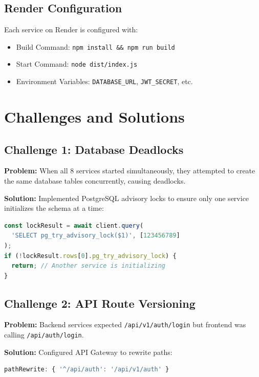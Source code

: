 \documentclass[12pt,a4paper]{article}
\begin{document}
\subsection{Render Configuration}

Each service on Render is configured with:
\begin{itemize}
    \item Build Command: \texttt{npm install \&\& npm run build}
    \item Start Command: \texttt{node dist/index.js}
    \item Environment Variables: \texttt{DATABASE\_URL}, \texttt{JWT\_SECRET}, etc.
\end{itemize}

\section{Challenges and Solutions}

\subsection{Challenge 1: Database Deadlocks}

\textbf{Problem:} When all 8 services started simultaneously, they attempted to create the same database tables concurrently, causing deadlocks.

\textbf{Solution:} Implemented PostgreSQL advisory locks to ensure only one service initializes the schema at a time:

\begin{lstlisting}[language=TypeScript]
const lockResult = await client.query(
  'SELECT pg_try_advisory_lock($1)', [123456789]
);
if (!lockResult.rows[0].pg_try_advisory_lock) {
  return; // Another service is initializing
}
\end{lstlisting}

\subsection{Challenge 2: API Route Versioning}

\textbf{Problem:} Backend services expected \texttt{/api/v1/auth/login} but frontend was calling \texttt{/api/auth/login}.

\textbf{Solution:} Configured API Gateway to rewrite paths:

\begin{lstlisting}[language=JavaScript]
pathRewrite: { '^/api/auth': '/api/v1/auth' }
\end{lstlisting}
\end{document}
